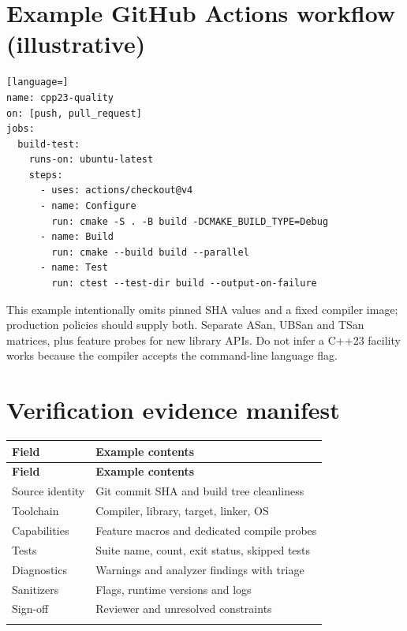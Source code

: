 \documentclass[11pt]{article}
\begin{document}
\section{Example GitHub Actions workflow (illustrative)}
\begin{lstlisting}[language=]
name: cpp23-quality
on: [push, pull_request]
jobs:
  build-test:
    runs-on: ubuntu-latest
    steps:
      - uses: actions/checkout@v4
      - name: Configure
        run: cmake -S . -B build -DCMAKE_BUILD_TYPE=Debug
      - name: Build
        run: cmake --build build --parallel
      - name: Test
        run: ctest --test-dir build --output-on-failure
\end{lstlisting}
This example intentionally omits pinned SHA values and a fixed compiler image; production policies should supply both. Separate ASan, UBSan and TSan matrices, plus feature probes for new library APIs. Do not infer a C++23 facility works because the compiler accepts the command-line language flag.

\section{Verification evidence manifest}
\small
\begin{longtable}{@{}p{.25\linewidth}p{.69\linewidth}@{}}
\toprule
\textbf{Field} & \textbf{Example contents}\\
\midrule
\endfirsthead
\toprule
\textbf{Field} & \textbf{Example contents}\\
\midrule
\endhead
Source identity & Git commit SHA and build tree cleanliness\\
\addlinespace[2pt]
Toolchain & Compiler, library, target, linker, OS\\
\addlinespace[2pt]
Capabilities & Feature macros and dedicated compile probes\\
\addlinespace[2pt]
Tests & Suite name, count, exit status, skipped tests\\
\addlinespace[2pt]
Diagnostics & Warnings and analyzer findings with triage\\
\addlinespace[2pt]
Sanitizers & Flags, runtime versions and logs\\
\addlinespace[2pt]
Sign-off & Reviewer and unresolved constraints\\
\addlinespace[2pt]
\bottomrule
\end{longtable}
\normalsize
\docend
\end{document}
